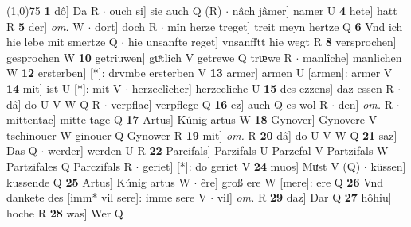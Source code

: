 \documentclass[8pt,a4paper,notitlepage]{article}
\begin{document}
\begin{table}[ht]
\begin{minipage}[t]{0.5\linewidth}
\line(1,0){75} \newline
\textbf{1} dô] Da R  $\cdot$ ouch si] sie auch Q (R)  $\cdot$ nâch jâmer] namer U \textbf{4} hete] hatt R \textbf{5} der] \textit{om.} W  $\cdot$ dort] doch R  $\cdot$ mîn herze treget] treit meyn hertze Q \textbf{6} Vnd ich hie lebe mit smertze Q  $\cdot$ hie unsanfte reget] vnsanfftt hie wegt R \textbf{8} versprochen] gesprochen W \textbf{10} getriuwen] guͤtlich V getrewe Q trᵫwe R  $\cdot$ manlîche] manlichen W \textbf{12} ersterben] [*]: drvmbe ersterben V \textbf{13} armer] armen U [armen]: armer V \textbf{14} mit] ist U [*]: mit V  $\cdot$ herzeclîcher] herzecliche U \textbf{15} des ezzens] daz essen R  $\cdot$ dâ] do U V W Q R  $\cdot$ verpflac] verpflege Q \textbf{16} ez] auch Q es wol R  $\cdot$ den] \textit{om.} R  $\cdot$ mittentac] mitte tage Q \textbf{17} Artus] Kúnig artus W \textbf{18} Gynover] Gynovere V tschinouer W ginouer Q Gynower R \textbf{19} mit] \textit{om.} R \textbf{20} dâ] do U V W Q \textbf{21} saz] Das Q  $\cdot$ werder] werden U R \textbf{22} Parcifals] Parzifals U Parzefal V Partzifals W Partzifales Q Parczifals R  $\cdot$ geriet] [*]: do geriet V \textbf{24} muos] Muͤst V (Q)  $\cdot$ küssen] kussende Q \textbf{25} Artus] Kúnig artus W  $\cdot$ êre] groß ere W [mere]: ere Q \textbf{26} Vnd dankete des [imm* vil sere]: imme sere V  $\cdot$ vil] \textit{om.} R \textbf{29} daz] Dar Q \textbf{27} hôhiu] hoche R \textbf{28} was] Wer Q \newline
\end{minipage}
\end{table}
\end{document}

